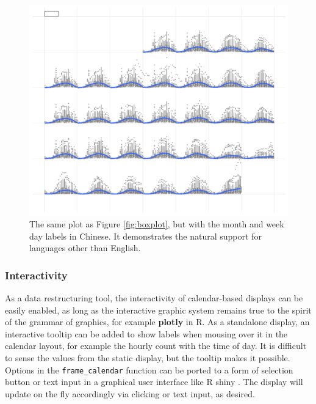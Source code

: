 \documentclass[12pt]{article}
\begin{document}
\begin{figure}

{\centering \includegraphics[width=\textwidth]{figure/chn-1} 

}

\caption{The same plot as Figure \ref{fig:boxplot}, but with the month and week day labels in Chinese. It demonstrates the natural support for languages other than English.}\label{fig:chn-embedded}
\end{figure}

\hypertarget{interactivity}{%
\subsubsection{Interactivity}\label{interactivity}}

As a data restructuring tool, the interactivity of calendar-based
displays can be easily enabled, as long as the interactive graphic
system remains true to the spirit of the grammar of graphics, for
example \textbf{plotly} \citep{plotly} in R. As a standalone display, an
interactive tooltip can be added to show labels when mousing over it in
the calendar layout, for example the hourly count with the time of day.
It is difficult to sense the values from the static display, but the
tooltip makes it possible. Options in the \texttt{frame\_calendar}
function can be ported to a form of selection button or text input in a
graphical user interface like R shiny \citep{R-shiny}. The display will
update on the fly accordingly via clicking or text input, as desired.
\end{document}
